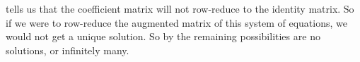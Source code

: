  tells us that the coefficient matrix will not row-reduce to the identity matrix.  So if we were to row-reduce the augmented matrix of this system of equations, we would not get a unique solution.  So by  the remaining possibilities are no solutions, or infinitely many.
